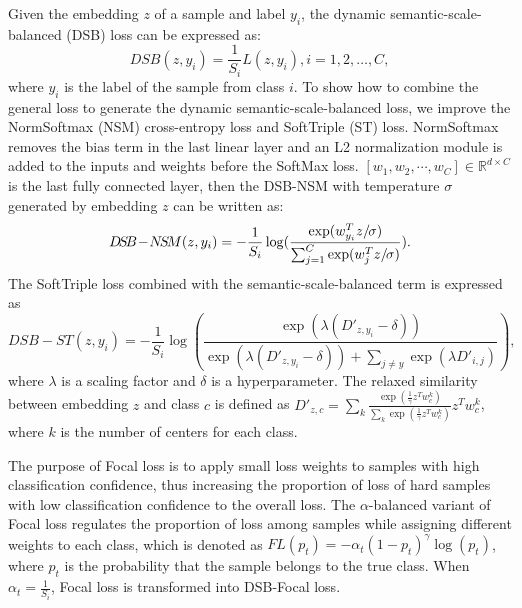 \documentclass[10pt]{article} %
\begin{document}
Given the embedding $z$ of a sample and label $y_{i}$, the dynamic semantic-scale-balanced (DSB) loss can be expressed as:\begin{equation}
D\!S\!B( {z,{y_i}} ) = \frac{1}{{{S_i}}}L( {z,{y_i}} ),i = 1,2, \ldots ,C,
\end{equation}where ${y_i}$ is the label of the sample from class $i$. To show how to combine the general loss to generate the dynamic semantic-scale-balanced loss, we improve the NormSoftmax (NSM) cross-entropy loss and SoftTriple (ST) loss. NormSoftmax removes the bias term in the last linear layer and an L2 normalization module is added to the inputs and weights before the SoftMax loss. $[{{w_1},{w_2},\cdots ,{w_C}}] \in {\mathbb{R}^{d \times C}}$ is the last fully connected layer, then the DSB-NSM with temperature $\sigma$ generated by embedding $z$ can be written as:\begin{equation}
D\!S\!B\!-\!N\!S\!M( {z,y_i} ) =  - \frac{1}{{{S_i}}}\log ( {\frac{{\exp ( {{{w_{{y_i}}^Tz} \mathord{/
 {\vphantom {{w_{{y_i}}^Tz} \sigma }} 
 \kern-\nulldelimiterspace} \sigma }} )}}{{\sum\nolimits_{j = 1}^C {\exp ( {{{w_j^Tz} \mathord{/
 {\vphantom {{w_j^Tz} \sigma }} 
 \kern-\nulldelimiterspace} \sigma }} )} }}} ).
\end{equation}The SoftTriple loss combined with the semantic-scale-balanced term is expressed as 
\begin{equation}
D\!S\!B\!-\!S\!T( {z,y_i} )=- \frac{1}{{{S_i}}}\!\log ( {\frac{{\exp ( {\lambda ( {{{D'}_{z,y_i}} - \delta } )} )}}{{\exp ( {\lambda ( {{{D'}_{z,y_i}} - \delta } )} ) + \sum\nolimits_{j \ne y} {\exp ( {\lambda {{D'}_{i,j}}} )} }}} ),
\end{equation}where $\lambda$ is a scaling factor and $\delta$ is a hyperparameter. The relaxed similarity between embedding $z$ and class $c$ is defined as ${{D'}_{z,c}} = \sum\limits_k {\frac{{\exp ( {\frac{1}{\gamma }z^Tw_c^k} )}}{{\sum\nolimits_k {\exp ( {\frac{1}{\gamma }z^Tw_c^k} )} }}} z^T\!w_c^k$, where $k$ is the number of centers for each class. 

The purpose of Focal loss is to apply small loss weights to samples with high classification confidence, thus increasing the proportion of loss of hard samples with low classification confidence to the overall loss. The $\alpha$-balanced variant of Focal loss regulates the proportion of loss among samples while assigning different weights to each class, which is denoted as $FL\left( {{p_t}} \right) =  - {\alpha _t}{\left( {1 - {p_t}} \right)^\gamma }\log \left( {{p_t}} \right)$, where $p_t$ is the probability that the sample belongs to the true class. When ${\alpha _t} = \frac{1}{{{S_i}}}$, Focal loss is transformed into DSB-Focal loss.
\end{document}
